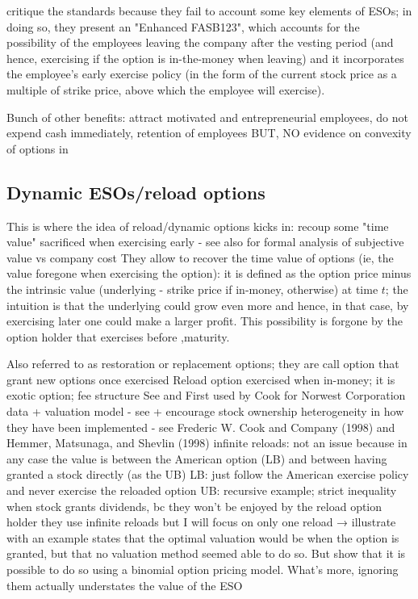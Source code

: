     \cite{hull2004value} critique the \cite{fasb123} standards because they fail to account some key elements of ESOs; in doing so, they present an "Enhanced FASB123", which accounts for the possibility of the employees leaving the company after the vesting period (and hence, exercising if the option is in-the-money when leaving) and it incorporates the employee's early exercise policy (in the form of the current stock price as a multiple of strike price, above which the employee will exercise).



    Bunch of other benefits: attract motivated and entrepreneurial employees, do not expend cash immediately, retention of employees  \cite{hall2003trouble}
    BUT, NO evidence on convexity of options in \cite{hayes2012stock}

\subsection{Dynamic ESOs/reload options} %
    This is where the idea of reload/dynamic options kicks in: recoup some "time value" sacrificed when exercising early - see also \cite{hall2002stock} for formal analysis of subjective value vs company cost
    They allow to recover the time value of options (ie, the value foregone when exercising the option): it is defined as the option price minus the intrinsic value (underlying - strike price if in-money, otherwise) at time $t$; the intuition is that the underlying could grow even more and hence, in that case, by exercising later one could make a larger profit. This possibility is forgone by the option holder that exercises before ,maturity.

    Also referred to as restoration or replacement options; they are call option that grant new options once exercised
    Reload option exercised when in-money; it is exotic option; fee structure \cite{zhang2010knightian}
    See \cite{hemmer1998optimal} and \cite{hemmer2000reload}
    First used by Cook for Norwest Corporation 
    data + valuation model - see \cite{dybvig2003employee}
    + encourage stock ownership 
    heterogeneity in how they have been implemented - see Frederic W. Cook and Company (1998) and Hemmer, Matsunaga, and Shevlin (1998) 
        infinite reloads: not an issue because in any case the value is between the American option (LB) and between having granted a stock directly (as the UB) \cite{dybvig2003employee}
            LB: just follow the American exercise policy and never exercise the reloaded option
            UB: recursive example; strict inequality when stock grants dividends, bc they won't be enjoyed by the reload option holder 
            they use infinite reloads but I will focus on only one reload 
    → illustrate with an example
    \cite{fasb123} states that the optimal valuation would be when the option is granted, but that no valuation method seemed able to do so.
    But \cite{saly1999valuing} show that it is possible to do so using a binomial option pricing model. What's more, ignoring them actually understates the value of the ESO \cite{saly1998ignoring}

